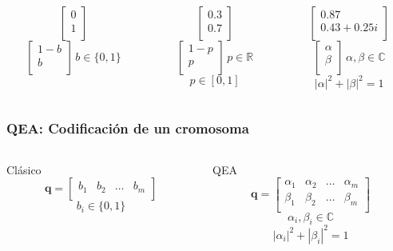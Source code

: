 \documentclass{beamer}
\begin{document}
\begin{frame}[t]
\begin{columns}[c]
	\begin{column}{0.33\textwidth}
		$$ \begin{bmatrix}
			0 \\
			1 \\
			\end{bmatrix} $$
		$$ \begin{bmatrix}
			1-b \\
			b \\
			\end{bmatrix}
			\, b \in \{0, 1\} $$
	\end{column}
	\vrule{}
	\begin{column}{0.33\textwidth}
		$$ \begin{bmatrix}
			0.3 \\
			0.7 \\
			\end{bmatrix} $$
		$$ \begin{bmatrix}
			1-p \\
			p \\
			\end{bmatrix}
			\, p \in \mathbb{R} $$
		$$ p \in [0,1]$$
	\end{column}
	\vrule{}
	\begin{column}{0.33\textwidth}
		$$ \begin{bmatrix}
			0.87 \\
			0.43 + 0.25i \\
			\end{bmatrix} $$
		$$ \begin{bmatrix}
			\alpha \\
			\beta \\
			\end{bmatrix} 
			\, \alpha, \beta \in \mathbb{C} $$
		$$ |\alpha|^2 + |\beta|^2 = 1 $$
	\end{column}
\end{columns}

\end{frame}
\begin{frame}
\frametitle{QEA: Codificación de un cromosoma}
\begin{columns}[c]
	\begin{column}{0.5\textwidth}
		\centering
		Clásico
		$$ \mathbf{q} = \begin{bmatrix}
			b_1	& b_2	& \ldots	& b_m\\
		\end{bmatrix} $$
		$$ b_i \in \{0, 1\}$$
	\end{column}
	\vrule{}
	\begin{column}{0.5\textwidth}
		\centering
		QEA
		$$ \mathbf{q} = \begin{bmatrix}
			\alpha_1	& \alpha_2	& \ldots	& \alpha_m\\
			\beta_1		& \beta_2		& \ldots	& \beta_m\\
		\end{bmatrix} $$
		$$ \alpha_i, \beta_i \in \mathbb{C} $$
		$$ |\alpha_i|^2 + |\beta_i|^2 = 1 $$
	\end{column}
\end{columns}
\end{frame}
\end{document}
